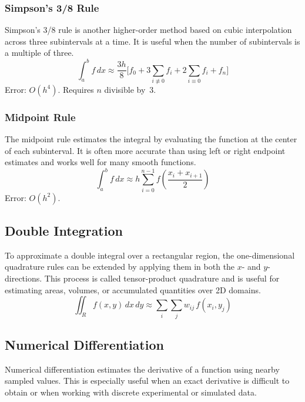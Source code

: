 \documentclass[letterpaper,twocolumn,fleqn]{article}
\begin{document}
\subsubsection{Simpson's 3/8 Rule}
Simpson's 3/8 rule is another higher-order method based on cubic interpolation across three subintervals at a time. It is useful when the number of subintervals is a multiple of three.
\begin{equation}
  \int_a^b f\,dx \approx \frac{3h}{8}\bigl[f_0 + 3\textstyle\sum_{i\not\equiv 0} f_i + 2\textstyle\sum_{i\equiv 0} f_i + f_n\bigr]
  \label{eq:s38}
\end{equation}
Error: $O(h^4)$. Requires $n$ divisible by~3.

\subsubsection{Midpoint Rule}
The midpoint rule estimates the integral by evaluating the function at the center of each subinterval. It is often more accurate than using left or right endpoint estimates and works well for many smooth functions.
\begin{equation}
  \int_a^b f\,dx \approx h \sum_{i=0}^{n-1} f\!\left(\frac{x_i + x_{i+1}}{2}\right)
  \label{eq:mid}
\end{equation}
Error: $O(h^2)$.

\subsection{Double Integration}
To approximate a double integral over a rectangular region, the one-dimensional quadrature rules can be extended by applying them in both the $x$- and $y$-directions. This process is called tensor-product quadrature and is useful for estimating areas, volumes, or accumulated quantities over 2D domains.
\begin{equation}
  \iint_R f(x,y)\,dx\,dy \approx \sum_i \sum_j w_{ij}\, f(x_i, y_j)
  \label{eq:double}
\end{equation}

\subsection{Numerical Differentiation}
Numerical differentiation estimates the derivative of a function using nearby sampled values. This is especially useful when an exact derivative is difficult to obtain or when working with discrete experimental or simulated data.
\end{document}
